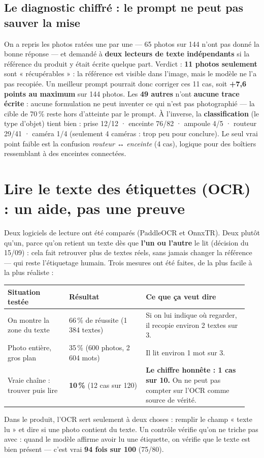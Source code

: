 \documentclass[10pt,a4paper]{article}
\begin{document}
\subsection{Le diagnostic chiffré : le prompt ne peut pas sauver la mise}
On a repris les photos ratées une par une — 65 photos sur 144 n'ont pas donné la bonne réponse —
et demandé à \textbf{deux lecteurs de texte indépendants} si la référence du produit y était écrite
quelque part. Verdict : \textbf{11 photos seulement} sont « récupérables » : la référence est
visible dans l'image, mais le modèle ne l'a pas recopiée. Un meilleur prompt pourrait donc
corriger ces 11 cas, soit \textbf{+7,6 points au maximum} sur 144 photos. Les \textbf{49 autres}
n'ont \textbf{aucune trace écrite} : aucune formulation ne peut inventer ce qui n'est pas
photographié — la cible de 70\,\% reste hors d'atteinte par le prompt. À l'inverse, la
\textbf{classification} (le type d'objet) tient bien : prise 12/12 · enceinte 76/82 · ampoule 4/5 ·
routeur 29/41 · caméra 1/4 (seulement 4 caméras : trop peu pour conclure). Le seul vrai point
faible est la confusion \emph{routeur} ↔ \emph{enceinte} (4 cas), logique pour des boîtiers
ressemblant à des enceintes connectées.

\section{Lire le texte des étiquettes (OCR) : un aide, pas une preuve}
Deux logiciels de lecture ont été comparés (PaddleOCR et OnnxTR). Deux plutôt qu'un, parce qu'on
retient un texte dès que \textbf{l'un ou l'autre} le lit (décision du 15/09) : cela fait
retrouver plus de textes réels, sans jamais changer la référence — qui reste l'étiquetage humain.
Trois mesures ont été faites, de la plus facile à la plus réaliste :
\begin{center}
\footnotesize\sffamily
\begin{tabular}{@{}p{0.24\linewidth}p{0.30\linewidth}p{0.40\linewidth}@{}}
\toprule
\textbf{Situation testée} & \textbf{Résultat} & \textbf{Ce que ça veut dire}\\
\midrule
On montre la zone du texte & 66\,\% de réussite (1\,384 textes) & Si on lui indique o\`u regarder, il recopie environ 2 textes sur 3.\\
Photo entière, gros plan & 35\,\% (600 photos, 2\,604 mots) & Il lit environ 1 mot sur 3.\\
Vraie chaîne : trouver puis lire & \textbf{10\,\%} (12 cas sur 120) & \textbf{Le chiffre honnête : 1 cas sur 10.} On ne peut pas compter sur l'OCR comme source de vérité.\\
\bottomrule
\end{tabular}
\end{center}
Dans le produit, l'OCR sert seulement à deux choses : remplir le champ « texte lu » et dire si une
photo contient du texte. Un contrôle vérifie qu'on ne triche pas avec : quand le modèle affirme
avoir lu une étiquette, on vérifie que le texte est bien présent — c'est vrai \textbf{94 fois sur
100} (75/80).
\end{document}
